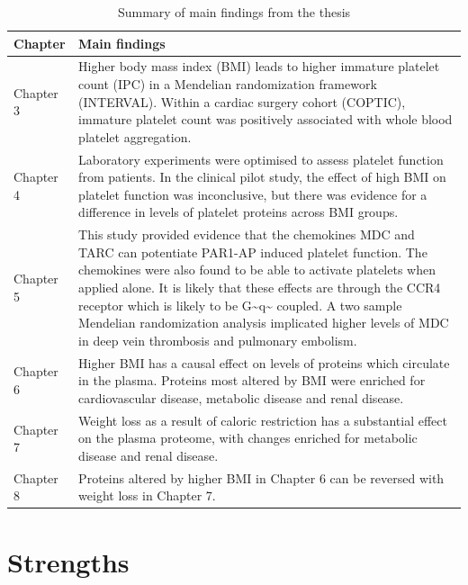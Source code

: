 \documentclass[11pt,twoside]{bristolthesis}
\begin{document}
\begin{landscape}\begin{table}

\caption{\label{tab:main-thesis-findings}Summary of main findings from the thesis}
\centering
\begin{tabu} to 
\toprule
Chapter & Main findings\\
\midrule
Chapter 3 & Higher body mass index (BMI) leads to higher immature platelet count (IPC) in a Mendelian randomization framework (INTERVAL). Within a cardiac surgery cohort (COPTIC), immature platelet count was positively associated with whole blood platelet aggregation.\\
Chapter 4 & Laboratory experiments were optimised to assess platelet function from patients. In the clinical pilot study, the effect of high BMI on platelet function was inconclusive, but there was evidence for a difference in levels of platelet proteins across BMI groups.\\
Chapter 5 & This study provided evidence that the chemokines MDC and TARC can potentiate PAR1-AP induced platelet function. The chemokines were also found to be able to activate platelets when applied alone. It is likely that these effects are through the CCR4 receptor which is likely to be G\textasciitilde{}q\textasciitilde{} coupled. A two sample Mendelian randomization analysis implicated higher levels of MDC in deep vein thrombosis and pulmonary embolism.\\
Chapter 6 & Higher BMI has a causal effect on levels of proteins which circulate in the plasma. Proteins most altered by BMI were enriched for cardiovascular disease, metabolic disease and renal disease.\\
Chapter 7 & Weight loss as a result of caloric restriction has a substantial effect on the plasma proteome, with changes enriched for metabolic disease and renal disease.\\
\addlinespace
Chapter 8 & Proteins altered by higher BMI in Chapter 6 can be reversed with weight loss in Chapter 7.\\
\bottomrule
\end{tabu}
\end{table}
\end{landscape}
\hypertarget{strengths}{%
\section{Strengths}\label{strengths}}
\end{document}
